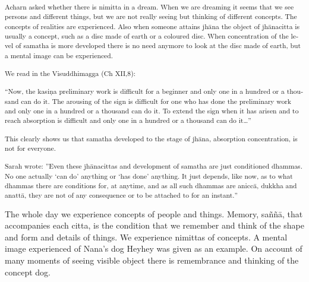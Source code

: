 \textsuperscript{\textdutch{Acharn asked whether there is nimitta in a
dream. When we are dreaming it seems that we see persons and different
things, but we are not really seeing but thinking of different concepts.
The concepts of realities are experienced. Also when someone attains
jhāna the object of jhānacitta is usually a concept, such as a disc made
of earth or a coloured disc. When concentration of the level of samatha
is more developed there is no need anymore to look at the disc made of
earth, but a mental image can be experienced. }}

\textsuperscript{\textdutch{We read in the Visuddhimagga (Ch XII,8):}}

\textsuperscript{``\textenglish[variant=american]{Now, the
kasi}{{ṇ}}\textenglish[variant=american]{a preliminary work is difficult
for a beginner and only one in a hundred or a thousand can do it. The
arousing of the sign is difficult for one who has done the preliminary
work and only one in a hundred or a thousand can do it. To extend the
sign when it has arisen and to reach absorption is difficult and only
one in a hundred or a thousand can do it}\textdutch{\ldots{}''}}

\textsuperscript{\textdutch{This clearly shows us that samatha developed
to the stage of jhāna, absorption concentration, is not for everyone. }}

\textsuperscript{\textdutch{Sarah wrote:
''E}\textenglish[variant=american]{ven these
jh}{{ā}}\textenglish[variant=american]{nacittas and development of
samatha are just conditioned dhammas. No one actually
}\textdutch{`}\textenglish[variant=american]{can
do}\textdutch{'}\textenglish[variant=american]{ anything or
}\textdutch{`}\textenglish[variant=american]{has
done}\textdutch{'}\textenglish[variant=american]{ anything. It just
depends, like now, as to what dhammas there are conditions
for}\textdutch{,}\textenglish[variant=american]{ at
anytime}\textdutch{,}\textenglish[variant=american]{ and as all such
dhammas are anicc}\textdutch{ā}, dukkha and
anatt{{ā}}\textenglish[variant=american]{, they are not of any
consequence or to be attached to for an instant.}\textdutch{''}}

\textdutch{The whole day we experience concepts of people and things.
Memory, saññā, that accompanies each citta, is the condition that we
remember and think of the shape and form and details of things. We
experience nimittas of concepts. A mental image experienced of Nana's
dog Heyhey was given as an example. On account of many moments of seeing
visible object there is remembrance and thinking of the concept dog. }

